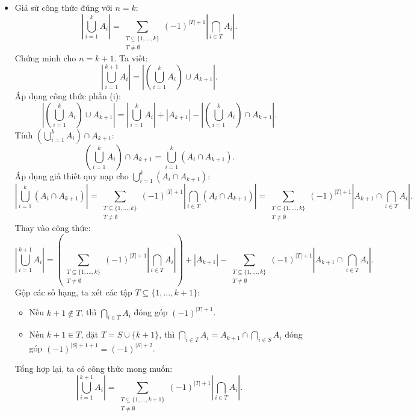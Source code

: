 \documentclass[a4paper,12pt]{article}
\begin{document}
\begin{itemize}
    \item Giả sử công thức đúng với $n=k$:
    \[
    \left| \bigcup_{i=1}^{k} A_i \right| = \sum_{\substack{T \subseteq \{1, \ldots, k\} \\ T \neq \emptyset}} (-1)^{|T|+1} \left| \bigcap_{i \in T} A_i \right|.
    \]
    Chứng minh cho $n=k+1$. Ta viết:
    \[
    \left| \bigcup_{i=1}^{k+1} A_i \right| = \left| \left( \bigcup_{i=1}^{k} A_i \right) \cup A_{k+1} \right|.
    \]
    Áp dụng công thức phần (i):
    \[
    \left| \left( \bigcup_{i=1}^{k} A_i \right) \cup A_{k+1} \right| = \left| \bigcup_{i=1}^{k} A_i \right| + |A_{k+1}| - \left| \left( \bigcup_{i=1}^{k} A_i \right) \cap A_{k+1} \right|.
    \]
    Tính $\left( \bigcup_{i=1}^{k} A_i \right) \cap A_{k+1}$:
    \[
    \left( \bigcup_{i=1}^{k} A_i \right) \cap A_{k+1} = \bigcup_{i=1}^{k} (A_i \cap A_{k+1}).
    \]
    Áp dụng giả thiết quy nạp cho $\bigcup_{i=1}^{k} (A_i \cap A_{k+1})$:
    \[
    \left| \bigcup_{i=1}^{k} (A_i \cap A_{k+1}) \right| = \sum_{\substack{T \subseteq \{1, \ldots, k\} \\ T \neq \emptyset}} (-1)^{|T|+1} \left| \bigcap_{i \in T} (A_i \cap A_{k+1}) \right| = \sum_{\substack{T \subseteq \{1, \ldots, k\} \\ T \neq \emptyset}} (-1)^{|T|+1} \left| A_{k+1} \cap \bigcap_{i \in T} A_i \right|.
    \]
    Thay vào công thức:
    \[
    \left| \bigcup_{i=1}^{k+1} A_i \right| = \left( \sum_{\substack{T \subseteq \{1, \ldots, k\} \\ T \neq \emptyset}} (-1)^{|T|+1} \left| \bigcap_{i \in T} A_i \right| \right) + |A_{k+1}| - \sum_{\substack{T \subseteq \{1, \ldots, k\} \\ T \neq \emptyset}} (-1)^{|T|+1} \left| A_{k+1} \cap \bigcap_{i \in T} A_i \right|.
    \]
    Gộp các số hạng, ta xét các tập $T \subseteq \{1, \ldots, k+1\}$:
    \begin{itemize}
        \item Nếu $k+1 \notin T$, thì $\bigcap_{i \in T} A_i$ đóng góp $(-1)^{|T|+1}$.
        \item Nếu $k+1 \in T$, đặt $T = S \cup \{k+1\}$, thì $\bigcap_{i \in T} A_i = A_{k+1} \cap \bigcap_{i \in S} A_i$ đóng góp $(-1)^{|S|+1+1} = (-1)^{|S|+2}$.
    \end{itemize}
    Tổng hợp lại, ta có công thức mong muốn:
    \[
    \left| \bigcup_{i=1}^{k+1} A_i \right| = \sum_{\substack{T \subseteq \{1, \ldots, k+1\} \\ T \neq \emptyset}} (-1)^{|T|+1} \left| \bigcap_{i \in T} A_i \right|.
    \]
\end{itemize}
\end{document}
